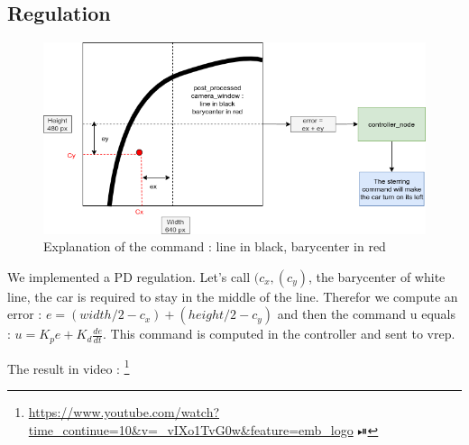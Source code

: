 \subsection{Regulation}
\begin{figure}[ht!]
    \begin{center}
        \includegraphics[scale=0.5]{Images/command_explanation.png}
    \end{center}
    \caption{Explanation of the command : line in black, barycenter in red}
    \label{fig:command_explanation}

\end{figure}
We implemented a PD regulation. Let's call $(c_x, (c_y)$, the barycenter of white line, the car is required to stay in the middle of the line.
Therefor we compute an error : $e = (width/2 - c_x) + (height/2 - c_y)$ and then the command u equals : 
$u = K_p e + K_d \frac{de}{dt}$. This command is computed in the controller and sent to vrep.


The result in video : \footnote{\url{https://www.youtube.com/watch?time_continue=10&v=_vIXo1TvG0w&feature=emb_logo} ⏯}  




